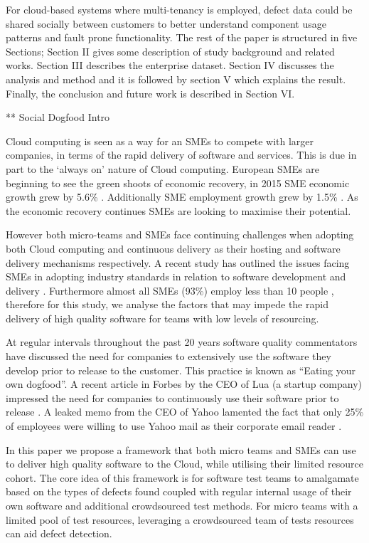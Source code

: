 For cloud-based systems where multi-tenancy is employed, defect data could be shared socially between customers to better understand component usage patterns and fault prone functionality. The rest of the paper is structured in five Sections; Section II gives some description of study background and related works. Section III describes the enterprise dataset. Section IV discusses the analysis and method and it is followed by section V which explains the result. Finally, the conclusion and future work is described in Section VI.


** Social Dogfood Intro

Cloud computing is seen as a way for an SMEs to compete with larger companies, in terms of the rapid delivery of software and services. This is due in part to the `always on' nature of Cloud computing. European SMEs are beginning to see the green shoots of economic recovery, in 2015 SME economic growth grew by 5.6\% \cite{europa2016sme}. Additionally SME employment growth grew by 1.5\% \cite{europa2016sme}. As the economic recovery continues SMEs are looking to maximise their potential. \par

However both micro-teams and SMEs face continuing challenges when adopting both Cloud computing and continuous delivery as their hosting and software delivery mechanisms respectively. A recent study has outlined the issues facing SMEs in adopting industry standards in relation to software development and delivery \cite{pusatli2011discussion}. Furthermore almost all SMEs (93\%) employ less than 10 people \cite{europa2016sme}, therefore for this study, we analyse the factors that may impede the rapid delivery of high quality software for teams with low levels of resourcing. \par

At regular intervals throughout the past 20 years software quality commentators have discussed the need for companies to extensively use the software they develop prior to release to the customer. This practice is known as ``Eating your own dogfood''\cite{wikidogfood}. A recent article in Forbes by the CEO of Lua (a startup company) impressed the need for companies to continuously use their software prior to release \cite{forbesdogfood}. A leaked memo from the CEO of Yahoo lamented the fact that only 25\% of employees were willing to use Yahoo mail as their corporate email reader \cite{forbesyahoodogfood}. \par

In this paper we propose a framework that both micro teams and SMEs can use to deliver high quality software to the Cloud, while utilising their limited resource cohort. The core idea of this framework is for software test teams to amalgamate based on the types of defects found coupled with regular internal usage of their own software and additional crowdsourced test methods. For micro teams with a limited pool of test resources, leveraging a crowdsourced team of tests resources can aid defect detection.  \par

